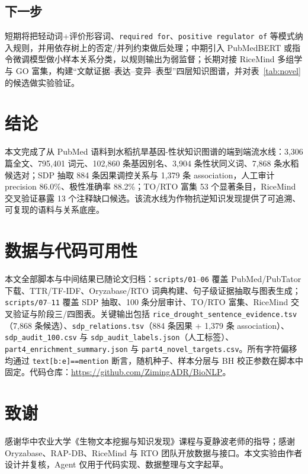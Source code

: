 \documentclass[conference]{IEEEtran}
\begin{document}
\subsection{下一步}
短期将把轻动词+评价形容词、\texttt{required for}、\texttt{positive regulator of} 等模式纳入规则，并用依存树上的否定/并列约束做后处理；中期引入 PubMedBERT 或指令微调模型做小样本关系分类，以规则输出为弱监督；长期对接 RiceMind 多组学与 GO 富集，构建“文献证据--表达--变异--表型”四层知识图谱，并对表~\ref{tab:novel} 的候选做实验验证。

\section{结论}
本文完成了从 PubMed 语料到水稻抗旱基因-性状知识图谱的端到端流水线：3,306 篇全文、795,401 词元、102,860 条基因别名、3,904 条性状同义词、7,868 条水稻候选对；SDP 抽取 884 条因果调控关系与 1,379 条 association，人工审计 precision 86.0\%、极性准确率 88.2\%；TO/RTO 富集 53 个显著条目，RiceMind 交叉验证暴露 13 个注释缺口候选。该流水线为作物抗逆知识发现提供了可追溯、可复现的语料与关系底座。

\section*{数据与代码可用性}
本文全部脚本与中间结果已随论文归档：\texttt{scripts/01}--\texttt{06} 覆盖 PubMed/PubTator 下载、TTR/TF-IDF、Oryzabase/RTO 词典构建、句子级证据抽取与图表生成；\texttt{scripts/07}--\texttt{11} 覆盖 SDP 抽取、100 条分层审计、TO/RTO 富集、RiceMind 交叉验证与阶段三/四图表。关键输出包括 \texttt{rice\_drought\_sentence\_evidence.tsv}（7,868 条候选）、\texttt{sdp\_relations.tsv}（884 条因果 + 1,379 条 association）、\texttt{sdp\_audit\_100.csv} 与 \texttt{sdp\_audit\_labels.json}（人工标签）、\texttt{part4\_enrichment\_summary.json} 与 \texttt{part4\_novel\_targets.csv}。所有字符偏移均通过 \texttt{text[b:e]==mention} 断言，随机种子、样本分层与 BH 校正参数在脚本中固定。代码仓库：\url{https://github.com/ZimingADR/BioNLP}。

\section*{致谢}
感谢华中农业大学《生物文本挖掘与知识发现》课程与夏静波老师的指导；感谢 Oryzabase、RAP-DB、RiceMind 与 RTO 团队开放数据与接口。本文实验由作者设计并复核，Agent 仅用于代码实现、数据整理与文字起草。



\end{document}
